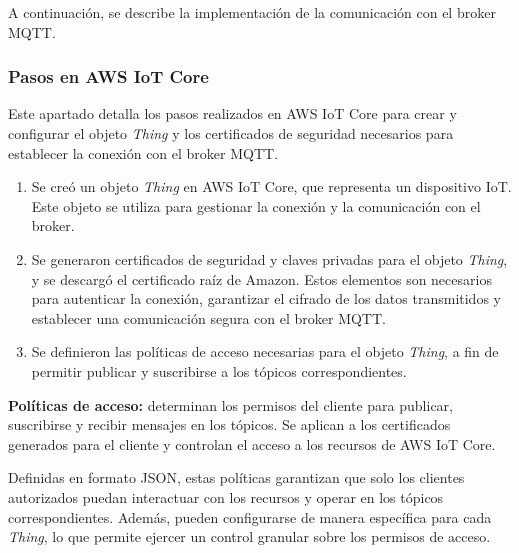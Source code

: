 A continuación, se describe la implementación de la comunicación con el broker
MQTT.


\subsubsection{Pasos en AWS IoT Core}

Este apartado detalla los pasos realizados en AWS IoT Core para crear y
configurar el objeto \textit{Thing} y los certificados de seguridad necesarios
para establecer la conexión con el broker MQTT.

\begin{enumerate}
    \item Se creó un objeto \textit{Thing} en AWS IoT Core, que representa un dispositivo
          IoT. Este objeto se utiliza para gestionar la conexión y la comunicación con el
          broker.
    \item Se generaron certificados de seguridad y claves privadas para el objeto
          \textit{Thing}, y se descargó el certificado raíz de Amazon. Estos elementos
          son necesarios para autenticar la conexión, garantizar el cifrado de los datos
          transmitidos y establecer una comunicación segura con el broker MQTT.
    \item Se definieron las políticas de acceso necesarias para el objeto \textit{Thing},
          a fin de permitir publicar y suscribirse a los tópicos correspondientes.
\end{enumerate}

\textbf{Políticas de acceso:} determinan los permisos del cliente para publicar,
suscribirse y recibir mensajes en los tópicos. Se aplican a los certificados
generados para el cliente y controlan el acceso a los recursos de AWS IoT Core.

Definidas en formato JSON, estas políticas garantizan que solo los clientes
autorizados puedan interactuar con los recursos y operar en los tópicos
correspondientes. Además, pueden configurarse de manera específica para cada
\textit{Thing}, lo que permite ejercer un control granular sobre los permisos
de acceso.

